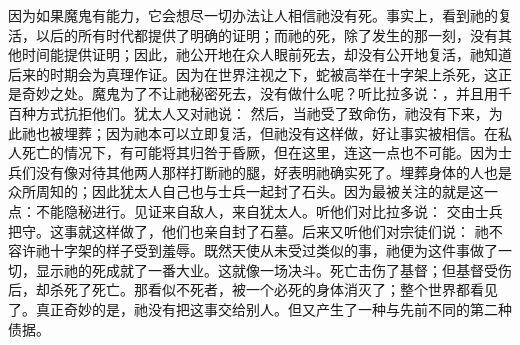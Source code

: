 因为如果魔鬼有能力，它会想尽一切办法让人相信祂没有死。事实上，看到祂的复活，以后的所有时代都提供了明确的证明；而祂的死，除了发生的那一刻，没有其他时间能提供证明；因此，祂公开地在众人眼前死去，却没有公开地复活，祂知道后来的时期会为真理作证。因为在世界注视之下，蛇被高举在十字架上杀死，这正是奇妙之处。魔鬼为了不让祂秘密死去，没有做什么呢？听比拉多说：，并且用千百种方式抗拒他们。犹太人又对祂说： 然后，当祂受了致命伤，祂没有下来，为此祂也被埋葬；因为祂本可以立即复活，但祂没有这样做，好让事实被相信。在私人死亡的情况下，有可能将其归咎于昏厥，但在这里，连这一点也不可能。因为士兵们没有像对待其他两人那样打断祂的腿，好表明祂确实死了。埋葬身体的人也是众所周知的；因此犹太人自己也与士兵一起封了石头。因为最被关注的就是这一点：不能隐秘进行。见证来自敌人，来自犹太人。听他们对比拉多说： 交由士兵把守。这事就这样做了，他们也亲自封了石墓。后来又听他们对宗徒们说： 祂不容许祂十字架的样子受到羞辱。既然天使从未受过类似的事，祂便为这件事做了一切，显示祂的死成就了一番大业。这就像一场决斗。死亡击伤了基督；但基督受伤后，却杀死了死亡。那看似不死者，被一个必死的身体消灭了；整个世界都看见了。真正奇妙的是，祂没有把这事交给别人。但又产生了一种与先前不同的第二种债据。\par

